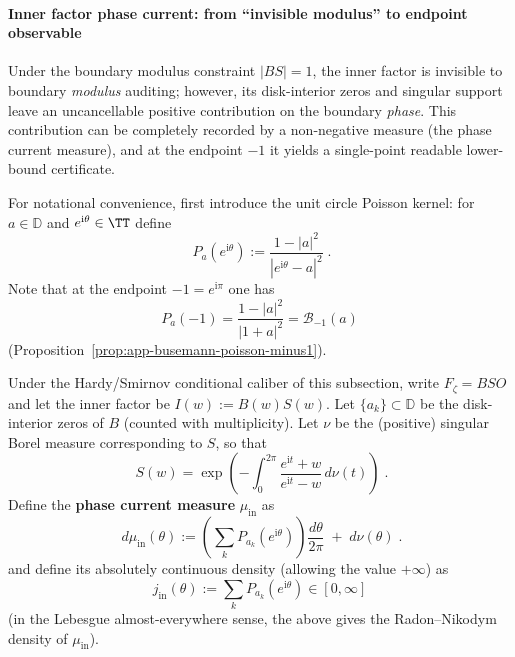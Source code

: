 \paragraph{Inner factor phase current: from ``invisible modulus'' to endpoint observable}
Under the boundary modulus constraint \(|BS|=1\), the inner factor is invisible to boundary \emph{modulus} auditing; however, its disk-interior zeros and singular support leave an uncancellable positive contribution on the boundary \emph{phase}.
This contribution can be completely recorded by a non-negative measure (the phase current measure), and at the endpoint \(-1\) it yields a single-point readable lower-bound certificate.

\medskip
For notational convenience, first introduce the unit circle Poisson kernel: for \(a\in\mathbb{D}\) and \(e^{\mathrm{i}\theta}\in\TT\) define
\begin{equation}\label{eq:app-poisson-kernel}
\boxed{\;
P_a(e^{\mathrm{i}\theta})
:=\frac{1-|a|^2}{|e^{\mathrm{i}\theta}-a|^2}\; }.
\end{equation}
Note that at the endpoint \(-1=e^{\mathrm{i}\pi}\) one has
\begin{equation}\label{eq:app-poisson-kernel-endpoint-minus1}
\boxed{\;
P_a(-1)=\frac{1-|a|^2}{|1+a|^2}=\mathcal{B}_{-1}(a)\;}
\end{equation}
(Proposition~\ref{prop:app-busemann-poisson-minus1}).

\begin{definition}\label{def:app-inner-phase-current}
Under the Hardy/Smirnov conditional caliber of this subsection, write \(F_{\zeta}=BSO\) and let the inner factor be \(I(w):=B(w)S(w)\).
Let \(\{a_k\}\subset\mathbb{D}\) be the disk-interior zeros of \(B\) (counted with multiplicity).
Let \(\nu\) be the (positive) singular Borel measure corresponding to \(S\), so that
\begin{equation}\label{eq:app-singular-inner-factor-measure}
\boxed{\;
S(w)
=\exp\!\left(
-\int_{0}^{2\pi}\frac{e^{\mathrm{i}t}+w}{e^{\mathrm{i}t}-w}\,d\nu(t)
\right)\; }.
\end{equation}
Define the \textbf{phase current measure} \(\mu_{\mathrm{in}}\) as
\begin{equation}\label{eq:app-inner-phase-current-measure}
\boxed{\;
d\mu_{\mathrm{in}}(\theta)
:=
\left(\sum_k P_{a_k}(e^{\mathrm{i}\theta})\right)\frac{d\theta}{2\pi}
\;+\;
d\nu(\theta)\; }.
\end{equation}
and define its absolutely continuous density (allowing the value \(+\infty\)) as
\begin{equation}\label{eq:app-inner-phase-current-density}
\boxed{\;
j_{\mathrm{in}}(\theta):=\sum_k P_{a_k}(e^{\mathrm{i}\theta})\in[0,\infty]\;}
\end{equation}
(in the Lebesgue almost-everywhere sense, the above gives the Radon--Nikodym density of \(\mu_{\mathrm{in}}\)).
\end{definition}

